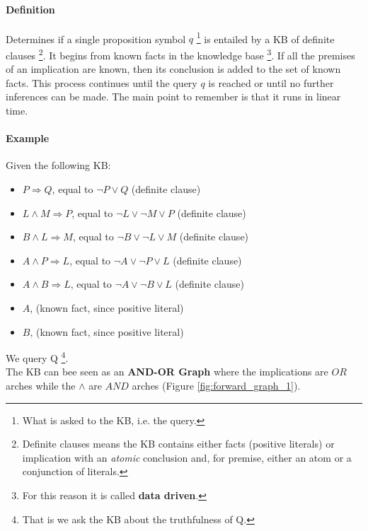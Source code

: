 \documentclass[10pt,a4paper]{article}
\begin{document}
\paragraph{Definition}
Determines if a single proposition symbol $q$ \footnote{What is asked to the KB, i.e. the query.} is entailed by a KB of definite clauses \footnote{Definite clauses means the KB contains either facts (positive literals) or implication with an \textit{atomic} conclusion and, for premise, either an atom or a conjunction of literals. }. It begins from known facts in the knowledge base \footnote{For this reason it is called \textbf{data driven}.}. If all the premises of an implication are known, then its conclusion is added to the set of known facts. This process continues until the query $q$ is reached or until no further inferences can be made. The main point to remember is that it runs in linear time.

\paragraph{Example}
Given the following KB:
\begin{itemize}
\item $P \Rightarrow Q$, equal to $\neg P \vee Q$ (definite clause)
\item $L \wedge M \Rightarrow P$, equal to $\neg L \vee \neg M \vee P$ (definite clause)
\item $B \wedge L \Rightarrow M$, equal to $\neg B \vee \neg L \vee M$ (definite clause)
\item $A \wedge P \Rightarrow L$, equal to $\neg A \vee \neg P \vee L$ (definite clause)
\item $A \wedge B \Rightarrow L$, equal to $\neg A \vee \neg B \vee L$ (definite clause)
\item $A$, (known fact, since positive literal)
\item $B$, (known fact, since positive literal)
\end{itemize}
We query Q \footnote{That is we ask the KB about the truthfulness of Q.}.\\
 The KB can bee seen as an \textbf{AND-OR Graph} where the implications are $OR$ arches while the $\wedge$ are $AND$ arches (Figure \ref{fig:forward_graph_1}).\\
\end{document}
